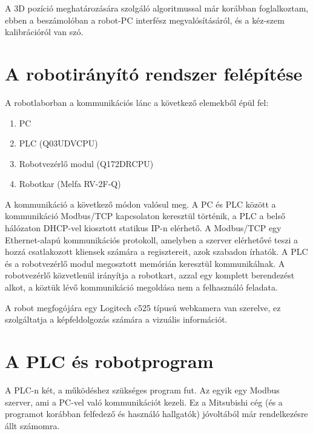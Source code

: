 \documentclass{article}
\begin{document}
	A 3D pozíció meghatározására szolgáló algoritmussal már korábban foglalkoztam, ebben a beszámolóban a robot-PC interfész megvalósításáról, és a kéz-szem kalibrációról van szó.
	
	\section{A robotirányító rendszer felépítése}
	A robotlaborban a kommunikációs lánc a következő elemekből épül fel:
	
\begin{enumerate}
\item PC
\item PLC (Q03UDVCPU)
\item Robotvezérlő modul (Q172DRCPU)
\item Robotkar (Melfa RV-2F-Q)
\end{enumerate}	

	A kommunikáció a következő módon valósul meg. A PC és PLC között a kommunikáció Modbus/TCP kapcsolaton keresztül történik, a PLC a belső hálózaton DHCP-vel kiosztott statikus IP-n elérhető. A Modbus/TCP egy Ethernet-alapú kommunikációs protokoll, amelyben a szerver elérhetővé teszi a hozzá csatlakozott kliensek számára a regisztereit, azok szabadon írhatók. A PLC és a robotvezérlő modul megosztott memórián keresztül kommunikálnak. A robotvezérlő közvetlenül irányítja a robotkart, azzal egy komplett berendezést alkot, a köztük lévő kommunikáció megoldása nem a felhasználó feladata.
	
	
	\newpage
	A robot megfogójára egy Logitech c525 típusú webkamera van szerelve, ez szolgáltatja a képfeldolgozás számára a vizuális információt.
	
	
	
	\section{A PLC és robotprogram}
	
	A PLC-n két, a működéshez szükséges program fut. Az egyik egy Modbus szerver, ami a PC-vel való kommunikációt kezeli. Ez a Mitsubishi cég (és a programot korábban felfedező és használó hallgatók) jóvoltából már rendelkezésre állt számomra. 
	
\end{document}
